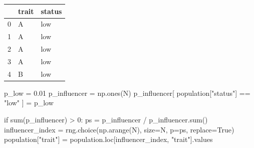 \documentclass[
  a4paperpaper,
  ,captions=tableheading
]{scrbook}
\newenvironment{Shaded}{\begin{snugshade}}{\end{snugshade}}
\newcommand{\BuiltInTok}[1]{\textcolor[rgb]{0.00,0.23,0.31}{#1}}
\newcommand{\ControlFlowTok}[1]{\textcolor[rgb]{0.00,0.23,0.31}{#1}}
\newcommand{\DecValTok}[1]{\textcolor[rgb]{0.68,0.00,0.00}{#1}}
\newcommand{\FloatTok}[1]{\textcolor[rgb]{0.68,0.00,0.00}{#1}}
\newcommand{\NormalTok}[1]{\textcolor[rgb]{0.00,0.23,0.31}{#1}}
\newcommand{\OperatorTok}[1]{\textcolor[rgb]{0.37,0.37,0.37}{#1}}
\newcommand{\StringTok}[1]{\textcolor[rgb]{0.13,0.47,0.30}{#1}}
\newcommand{\VariableTok}[1]{\textcolor[rgb]{0.07,0.07,0.07}{#1}}
\begin{document}
\begin{tabular}{lll}
\toprule
{} & trait & status \\
\midrule
0 &     A &    low \\
1 &     A &    low \\
2 &     A &    low \\
3 &     A &    low \\
4 &     B &    low \\
\bottomrule
\end{tabular}

\begin{Shaded}
\begin{Highlighting}[]
\NormalTok{p\_low }\OperatorTok{=} \FloatTok{0.01}
\NormalTok{p\_influencer }\OperatorTok{=}\NormalTok{ np.ones(N)}
\NormalTok{p\_influencer[ population[}\StringTok{"status"}\NormalTok{] }\OperatorTok{==} \StringTok{"low"}\NormalTok{ ] }\OperatorTok{=}\NormalTok{ p\_low}
\end{Highlighting}
\end{Shaded}

\begin{Shaded}
\begin{Highlighting}[]
\ControlFlowTok{if} \BuiltInTok{sum}\NormalTok{(p\_influencer) }\OperatorTok{\textgreater{}} \DecValTok{0}\NormalTok{:}
\NormalTok{    ps }\OperatorTok{=}\NormalTok{ p\_influencer }\OperatorTok{/}\NormalTok{ p\_influencer.}\BuiltInTok{sum}\NormalTok{()}
\NormalTok{    influencer\_index }\OperatorTok{=}\NormalTok{ rng.choice(np.arange(N), size}\OperatorTok{=}\NormalTok{N, p}\OperatorTok{=}\NormalTok{ps, replace}\OperatorTok{=}\VariableTok{True}\NormalTok{)}
\NormalTok{    population[}\StringTok{"trait"}\NormalTok{] }\OperatorTok{=}\NormalTok{ population.loc[influencer\_index, }\StringTok{"trait"}\NormalTok{].values}
\end{Highlighting}
\end{Shaded}
\end{document}
